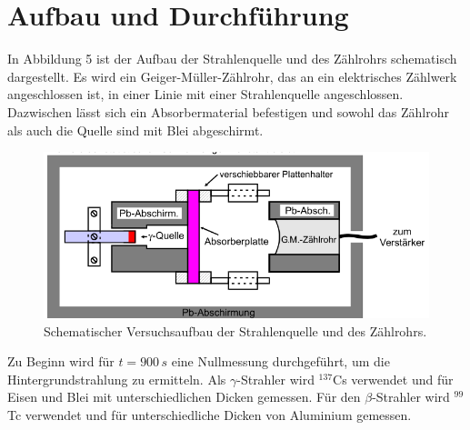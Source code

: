 \section{Aufbau und Durchführung}
\label{sec:Durchfuehrung}
In Abbildung 5 ist der Aufbau der Strahlenquelle und des Zählrohrs schematisch dargestellt. Es wird ein Geiger-Müller-Zählrohr, das an ein
elektrisches Zählwerk angeschlossen ist, in einer Linie mit einer Strahlenquelle angeschlossen. Dazwischen
lässt sich ein Absorbermaterial befestigen und sowohl das Zählrohr als auch die Quelle sind mit Blei abgeschirmt.
\begin{figure}
    \centering
    \label{fig:Aufbau}
    \includegraphics{Bilder/Aufbau.png}
    \caption{Schematischer Versuchsaufbau der Strahlenquelle und des Zählrohrs\cite{sample}.}
\end{figure}
Zu Beginn wird für $t=900\,\unit{s}$ eine Nullmessung durchgeführt, um die Hintergrundstrahlung zu ermitteln.
Als $\gamma$-Strahler wird $^{137}$Cs verwendet und für Eisen und Blei mit unterschiedlichen Dicken gemessen. Für den
$\beta$-Strahler wird $^{99}$Tc verwendet und für unterschiedliche Dicken von Aluminium gemessen.